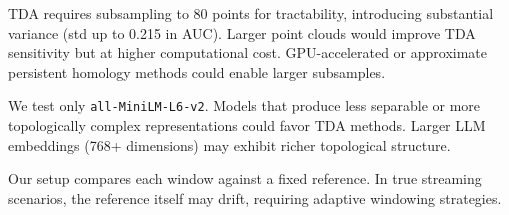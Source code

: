 TDA requires subsampling to 80 points for tractability, introducing substantial variance (std up to 0.215 in AUC). Larger point clouds would improve TDA sensitivity but at higher computational cost. GPU-accelerated or approximate persistent homology methods could enable larger subsamples.

We test only \texttt{all-MiniLM-L6-v2}. Models that produce less separable or more topologically complex representations could favor TDA methods. Larger LLM embeddings (768+ dimensions) may exhibit richer topological structure.

Our setup compares each window against a fixed reference. In true streaming scenarios, the reference itself may drift, requiring adaptive windowing strategies.
